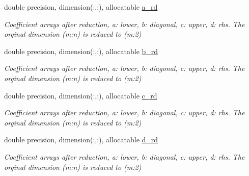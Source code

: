 \textbf{ }\par
\begin{DoxyCompactItemize}
\item 
double precision, dimension(\+:,\+:), allocatable \mbox{\hyperlink{structpascal__tdma_1_1ptdma__plan__many_a6d9101716eca623dc8c45075788f06bd}{a\+\_\+rd}}
\begin{DoxyCompactList}\small\item\em Coefficient arrays after reduction, a\+: lower, b\+: diagonal, c\+: upper, d\+: rhs. The orginal dimension (m\+:n) is reduced to (m\+:2) \end{DoxyCompactList}\item 
double precision, dimension(\+:,\+:), allocatable \mbox{\hyperlink{structpascal__tdma_1_1ptdma__plan__many_a81ed1b6910c30334e93598f7d18254a3}{b\+\_\+rd}}
\begin{DoxyCompactList}\small\item\em Coefficient arrays after reduction, a\+: lower, b\+: diagonal, c\+: upper, d\+: rhs. The orginal dimension (m\+:n) is reduced to (m\+:2) \end{DoxyCompactList}\item 
double precision, dimension(\+:,\+:), allocatable \mbox{\hyperlink{structpascal__tdma_1_1ptdma__plan__many_a56b15fe2b742c06106a46da7a720d9fd}{c\+\_\+rd}}
\begin{DoxyCompactList}\small\item\em Coefficient arrays after reduction, a\+: lower, b\+: diagonal, c\+: upper, d\+: rhs. The orginal dimension (m\+:n) is reduced to (m\+:2) \end{DoxyCompactList}\item 
double precision, dimension(\+:,\+:), allocatable \mbox{\hyperlink{structpascal__tdma_1_1ptdma__plan__many_aa1054814f874504a77ad17a838a80fd2}{d\+\_\+rd}}
\begin{DoxyCompactList}\small\item\em Coefficient arrays after reduction, a\+: lower, b\+: diagonal, c\+: upper, d\+: rhs. The orginal dimension (m\+:n) is reduced to (m\+:2) \end{DoxyCompactList}\end{DoxyCompactItemize}

